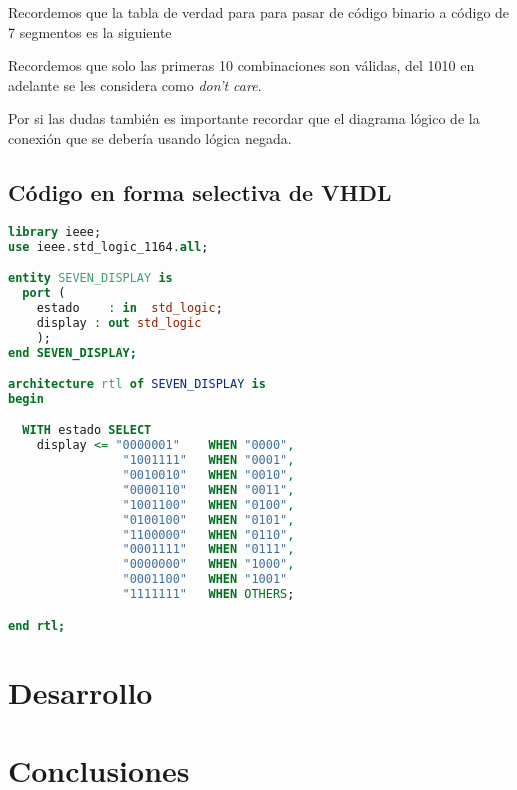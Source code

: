 \documentclass{mylib/reporteConCalif}
\begin{document}
Recordemos que la tabla de verdad para para pasar de código binario a código de 7 segmentos es la siguiente


Recordemos que solo las primeras 10 combinaciones son válidas, del 1010 en adelante se les considera como \textit{don't care}.

Por si las dudas también es importante recordar que el diagrama lógico de la conexión que se debería usando lógica negada.


\newpage
\subsection{Código en forma selectiva de VHDL}

\begin{lstlisting}[language=VHDL]
library ieee;
use ieee.std_logic_1164.all;

entity SEVEN_DISPLAY is
  port (
    estado    : in  std_logic;
    display : out std_logic
    );
end SEVEN_DISPLAY;

architecture rtl of SEVEN_DISPLAY is
begin

  WITH estado SELECT
    display <= "0000001"    WHEN "0000",
                "1001111"   WHEN "0001",
                "0010010"   WHEN "0010",
                "0000110"   WHEN "0011",
                "1001100"   WHEN "0100",
                "0100100"   WHEN "0101",
                "1100000"   WHEN "0110",
                "0001111"   WHEN "0111",
                "0000000"   WHEN "1000",
                "0001100"   WHEN "1001"
                "1111111"   WHEN OTHERS;

end rtl;
\end{lstlisting}


\newpage
\section{Desarrollo}



\section{Conclusiones}

\end{document}
